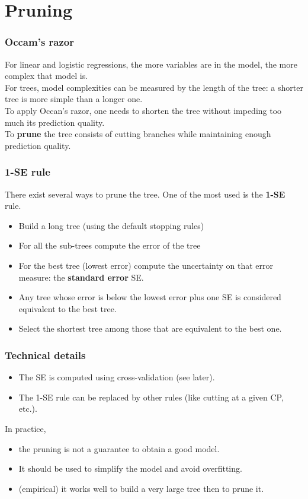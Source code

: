 \section{Pruning}
\begin{frame}
\frametitle{Occam's razor}
For linear and logistic regressions, the more variables are in the model, the more complex that model is.\\
\vspace{0.3cm}
For trees, model complexities can be measured by the length of the tree: a shorter tree is more simple than a longer one.\\
\vspace{0.3cm}
To apply Occan's razor, one needs to shorten the tree without impeding too much its prediction quality.\\
\vspace{0.3cm}
To {\bf prune} the tree consists of cutting branches while maintaining enough prediction quality. 
\end{frame}
\begin{frame}
\frametitle{1-SE rule}
There exist several ways to prune the tree. One of the most used is the {\bf 1-SE} rule. 
\begin{itemize}
\item Build a long tree (using the default stopping rules)
\item For all the sub-trees compute the error of the tree 
\item For the best tree (lowest error) compute the uncertainty on that error measure: the {\bf standard error} SE.
\item Any tree whose error is below the lowest error plus one SE is considered equivalent to the best tree.
\item Select the shortest tree among those that are equivalent to the best one.
\end{itemize}
\end{frame}
\begin{frame}
\frametitle{Technical details}
\begin{itemize}
\item The SE is computed using cross-validation (see later).
\item The 1-SE rule can be replaced by other rules (like cutting at a given CP, etc.). 
\end{itemize}
In practice, 
\begin{itemize}
\item the pruning is not a guarantee to obtain a good model. 
\item It should be used to simplify the model and avoid overfitting.
\item (empirical) it works well to build a very large tree then to prune it.
\end{itemize}
\end{frame}


